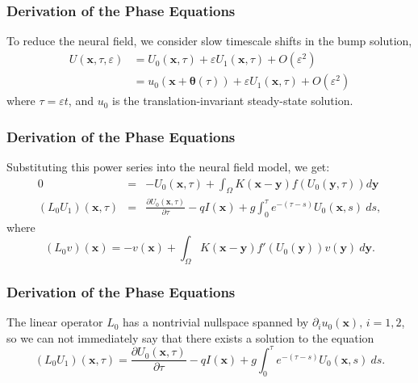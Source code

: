 \documentclass{beamer}
\newcommand{\x}{\mathbf{x}}
\newcommand{\y}{\mathbf{y}}
\newcommand{\q}{\boldsymbol{\theta}}
\newcommand{\io}{\int_\Omega}
\newcommand{\ve}{\varepsilon}
\newcommand{\pa}{\partial}
\begin{document}
\begin{frame}[allowframebreaks]
 
{}
\end{frame}






\section*{}

\subsection{}
\begin{frame}[noframenumbering]
\frametitle{Derivation of the Phase Equations}
To reduce the neural field, we consider slow timescale shifts in the bump solution,
 \begin{align*}
 U(\x,\tau,\ve) &= U_0(\x,\tau) + \varepsilon U_1(\x,\tau) + O(\varepsilon^2)\\
 &= u_0(\x+\q(\tau)) + \varepsilon U_1(\x,\tau) + O(\varepsilon^2)
\end{align*}
where $\tau = \varepsilon t$, and $u_0$ is the translation-invariant steady-state solution.
\end{frame}

\begin{frame}[noframenumbering]
\frametitle{Derivation of the Phase Equations}
Substituting this power series into the neural field model, we get:
\begin{eqnarray*}
0 &=& -U_0(\x,\tau) + \io K(\x-\y) f(U_0(\y,\tau)) d\y \\
 (L_0U_1)(\x,\tau) &=& \frac{\partial U_0(\x,\tau)}{\partial \tau} - q I(\x) + g \int_0^\tau e^{-(\tau-s)}U_0(\x,s)\ ds,
\end{eqnarray*}
where
\[
(L_0 v)(\x) = -v(\x) + \io K(\x-\y)f'(U_0(\y))v(\y)\ d\y.
\]
\end{frame}


\begin{frame}[noframenumbering]
\frametitle{Derivation of the Phase Equations}
The linear operator $L_0$ has a nontrivial nullspace spanned by $\pa_i u_0(\x), \,i=1,2$, so we can not immediately say that there exists a solution to the equation
\begin{equation*}
 (L_0U_1)(\x,\tau)  = \frac{\partial U_0(\x,\tau)}{\partial \tau} - q I(\x) + g \int_0^\tau e^{-(\tau-s)}U_0(\x,s)\ ds.
\end{equation*}
\end{frame}
\end{document}
